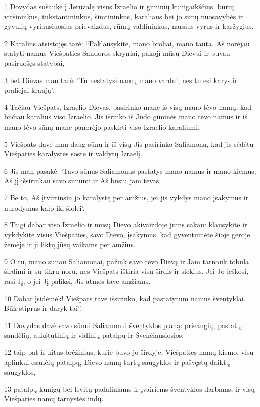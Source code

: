 \par 1 Dovydas sušaukė į Jeruzalę visus Izraelio ir giminių kunigaikščius, būrių viršininkus, tūkstantininkus, šimtininkus, karaliaus bei jo sūnų nuosavybės ir gyvulių vyriausiuosius prievaizdus, rūmų valdininkus, narsius vyrus ir karžygius. 
\par 2 Karalius atsistojęs tarė: “Paklausykite, mano broliai, mano tauta. Aš norėjau statyti namus Viešpaties Sandoros skryniai, pakojį mūsų Dievui ir buvau pasiruošęs statybai, 
\par 3 bet Dievas man tarė: ‘Tu nestatysi namų mano vardui, nes tu esi karys ir praliejai kraują’. 
\par 4 Tačiau Viešpats, Izraelio Dievas, pasirinko mane iš visų mano tėvo namų, kad būčiau karalius viso Izraelio. Jis išrinko iš Judo giminės mano tėvo namus ir iš mano tėvo sūnų mane panorėjo paskirti viso Izraelio karaliumi. 
\par 5 Viešpats davė man daug sūnų ir iš visų Jis pasirinko Saliamoną, kad jis sėdėtų Viešpaties karalystės soste ir valdytų Izraelį. 
\par 6 Jis man pasakė: ‘Tavo sūnus Saliamonas pastatys mano namus ir mano kiemus; Aš jį išsirinkau savo sūnumi ir Aš būsiu jam tėvas. 
\par 7 Be to, Aš įtvirtinsiu jo karalystę per amžius, jei jis vykdys mano įsakymus ir nurodymus kaip iki šiolei’. 
\par 8 Taigi dabar viso Izraelio ir mūsų Dievo akivaizdoje jums sakau: klausykite ir vykdykite visus Viešpaties, savo Dievo, įsakymus, kad gyventumėte šioje geroje žemėje ir ji liktų jūsų vaikams per amžius. 
\par 9 O tu, mano sūnau Saliamonai, pažink savo tėvo Dievą ir Jam tarnauk tobula širdimi ir su tikru noru, nes Viešpats ištiria visų širdis ir siekius. Jei Jo ieškosi, rasi Jį, o jei Jį paliksi, Jis atmes tave amžiams. 
\par 10 Dabar įsidėmėk! Viešpats tave išsirinko, kad pastatytum namus šventyklai. Būk stiprus ir daryk tai”. 
\par 11 Dovydas davė savo sūnui Saliamonui šventyklos planą: prieangių, pastatų, sandėlių, aukštutinių ir vidinių patalpų ir Švenčiausiosios; 
\par 12 taip pat ir kitus brėžinius, kurie buvo jo širdyje: Viešpaties namų kiemo, visų aplinkui esančių patalpų, Dievo namų turtų saugyklos ir pašvęstų daiktų saugyklos, 
\par 13 patalpų kunigų bei levitų padaliniams ir įvairiems šventyklos darbams, ir visų Viešpaties namų tarnystės indų. 
